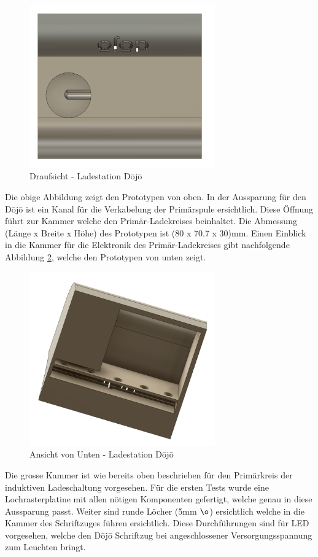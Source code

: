 \begin{figure}[H]
	\begin{center}
		\includegraphics[width=80mm]{data/DojoLadestation02.png}
		\caption[Prototyp Ladestation Draufsicht]{Draufsicht - Ladestation Dōjō} %
		\label{fig:Prototyp Top}
	\end{center}
\end{figure}

Die obige Abbildung  zeigt den Prototypen von oben. In der Aussparung für den Dōjō ist ein Kanal für die Verkabelung der Primärspule ersichtlich. Diese Öffnung führt zur Kammer welche den Primär-Ladekreises beinhaltet. Die Abmessung (Länge x Breite x Höhe) des Prototypen ist (80 x 70.7 x 30)mm. Einen Einblick in die Kammer für die Elektronik des Primär-Ladekreises gibt nachfolgende Abbildung \ref{fig:Prototyp Down}, welche den Prototypen von unten zeigt.

\begin{figure}[H]
	\begin{center}
		\includegraphics[width=80mm]{data/DojoLadestation03.png}
		\caption[Prototyp Ladestation Ansicht von Unten]{Ansicht von Unten - Ladestation Dōjō} %
		\label{fig:Prototyp Down}
	\end{center}
\end{figure}

Die grosse Kammer ist wie bereits oben beschrieben für den Primärkreis der induktiven Ladeschaltung vorgesehen. Für die ersten Tests wurde eine Lochrasterplatine mit allen nötigen Komponenten gefertigt, welche genau in diese Aussparung passt. Weiter sind runde Löcher (5mm $\o$) ersichtlich welche in die Kammer des Schriftzuges führen ersichtlich. Diese Durchführungen sind für LED vorgesehen, welche den Dōjō Schriftzug bei angeschlossener Versorgungsspannung zum Leuchten bringt. 